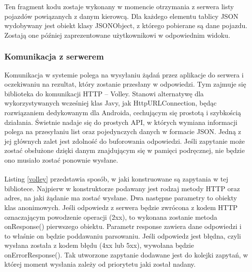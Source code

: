 \vspace{0.3cm}

Ten fragment kodu zostaje wykonany w momencie otrzymania z serwera listy pojazdów powiązanych z danym kierowcą. Dla każdego elementu tablicy JSON wydobywany jest obiekt klasy JSONObject, z którego pobierane są dane pojazdu. Zostają one później zaprezentowane użytkownikowi w odpowiednim widoku.

\subsubsection*{Komunikacja z serwerem}

Komunikacja w systemie polega na wysyłaniu żądań przez aplikacje do serwera i oczekiwaniu na rezultat, który zostanie przesłany w odpowiedzi. Tym zajmuje się biblioteka do komunikacji HTTP -- Volley. Stanowi alternatywę dla wykorzystywanych wcześniej klas Javy, jak HttpURLConnection, będąc rozwiązaniem dedykowanym dla Androida, cechującym się prostotą i szybkością działania. Świetnie nadaje się do prostych API, w których wymiana informacji polega na przesyłaniu list oraz pojedynczych danych w formacie JSON. Jedną z jej głównych zalet jest zdolność do buforowania odpowiedzi. Jeśli zapytanie może zostać obsłużone dzięki danym znajdującym się w pamięci podręcznej, nie będzie ono musiało zostać ponownie wysłane.
\\
\\
Listing \ref{volley} przedstawia sposób, w jaki konstruowane są zapytania w tej bibliotece. Najpierw w konstruktorze podawany jest rodzaj metody HTTP oraz adres, na jaki żądanie ma zostać wysłane. Dwa następne parametry to obiekty klas anonimowych. Jeśli odpowiedz z serwera będzie zwrócona z kodem HTTP oznaczającym powodzenie operacji (2xx), to wykonana zostanie metoda onResponse() pierwszego obiektu. Parametr response zawiera dane odpowiedzi i to właśnie on będzie poddawaniu parsowaniu. Jeśli odpowiedz jest błędna, czyli wysłana została z kodem błędu (4xx lub 5xx), wywołana będzie onErrorResponse(). Tak utworzone zapytanie dodawane jest do kolejki zapytań, w której moment wysłania zależy od priorytetu jaki został nadany.

\newpage

\begin{singlespace}
	\label{volley}
	\vspace{0.3cm}
	\inputminted[fontsize=\footnotesize]{java}{src/imp/scan-activity.java}
\end{singlespace}

